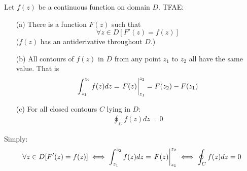 \documentclass[12pt, english]{book}
\begin{document}
	\begin{theorem}
		\label{Antiderivative and contour integrals theorem - Complex}
		Let \(f(z)\) be a continuous function on domain \(D\). TFAE:
		\begin{itemize}
			\item[(a)] There is a function \(F(z)\) such that 
			\[\forall z \in D [F'(z) = f(z)]\]
			(\(f(z)\) has an antiderivative throughout \(D\).)
			\item[(b)] All contours of \(f(z)\) in \(D\) from any point \(z_1\) to \(z_2\) all have the same value. That is 
			\begin{align*}
				\int_{z_1}^{z_2} f(z) dz = \eval{F(z)}_{z_1}^{z_2} = F(z_2) - F(z_1)
			\end{align*}
			\item[(c)] For all closed contours \(C\) lying in \(D\):
			\begin{align*}
				\oint_{C} f(z) dz = 0
			\end{align*}
		\end{itemize}
		Simply:
		\begin{align*}
			\forall z \in D [F'(z) = f(z)] 
			\iff \int_{z_1}^{z_2} f(z) dz = \eval{F(z)}_{z_1}^{z_2}
			\iff \oint_{C} f(z) dz = 0
		\end{align*}
	\end{theorem}
\end{document}
